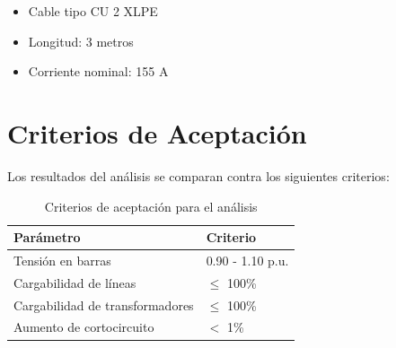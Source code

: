 \begin{itemize}
    \item Cable tipo CU 2 XLPE
    \item Longitud: 3 metros
    \item Corriente nominal: 155 A
\end{itemize}

\section{Criterios de Aceptación}

Los resultados del análisis se comparan contra los siguientes criterios:

\begin{table}[H]
    \centering
    \caption{Criterios de aceptación para el análisis}
    \begin{tabular}{ll}
    \toprule
    \textbf{Parámetro} & \textbf{Criterio} \\
    \midrule
    Tensión en barras & 0.90 - 1.10 p.u. \\
    Cargabilidad de líneas & $\leq$ 100\% \\
    Cargabilidad de transformadores & $\leq$ 100\% \\
    Aumento de cortocircuito & $<$ 1\% \\
    \bottomrule
    \end{tabular}
\end{table}
